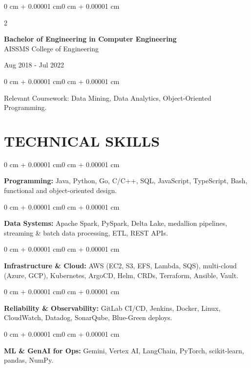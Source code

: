 \documentclass[10pt, letterpaper]{article}
\newenvironment{onecolentry}{
    \begin{adjustwidth}{0 cm + 0.00001 cm}{0 cm + 0.00001 cm}
}{
    \end{adjustwidth}
}
\newenvironment{twocolentry}[2][]{
    \onecolentry
    \def\secondColumn{#2}
    \setcolumnwidth{\fill, 4.5 cm}
    \begin{paracol}{2}
}{
    \switchcolumn \raggedleft \secondColumn
    \end{paracol}
    \endonecolentry
}
\begin{document}
\begin{twocolentry}{
    Aug 2018 - Jul 2022
}
    \textbf{Bachelor of Engineering in Computer Engineering} \\
    AISSMS College of Engineering
\end{twocolentry}
\begin{onecolentry}
Relevant Coursework: Data Mining, Data Analytics, Object-Oriented Programming.
\end{onecolentry}
\section{TECHNICAL SKILLS}
\begin{onecolentry}
\textbf{Programming:} Java, Python, Go, C/C++, SQL, JavaScript, TypeScript, Bash, functional and object-oriented design.
\end{onecolentry}
\vspace{0.06 cm}
\begin{onecolentry}
\textbf{Data Systems:} Apache Spark, PySpark, Delta Lake, medallion pipelines, streaming \& batch data processing, ETL, REST APIs.
\end{onecolentry}
\vspace{0.06 cm}
\begin{onecolentry}
\textbf{Infrastructure \& Cloud:} AWS (EC2, S3, EFS, Lambda, SQS), multi-cloud (Azure, GCP), Kubernetes, ArgoCD, Helm, CRDs, Terraform, Ansible, Vault.
\end{onecolentry}
\vspace{0.06 cm}
\begin{onecolentry}
\textbf{Reliability \& Observability:} GitLab CI/CD, Jenkins, Docker, Linux, CloudWatch, Datadog, SonarQube, Blue-Green deploys.
\end{onecolentry}
\vspace{0.06 cm}
\begin{onecolentry}
\textbf{ML \& GenAI for Ops:} Gemini, Vertex AI, LangChain, PyTorch, scikit-learn, pandas, NumPy.
\end{onecolentry}

\end{document}
